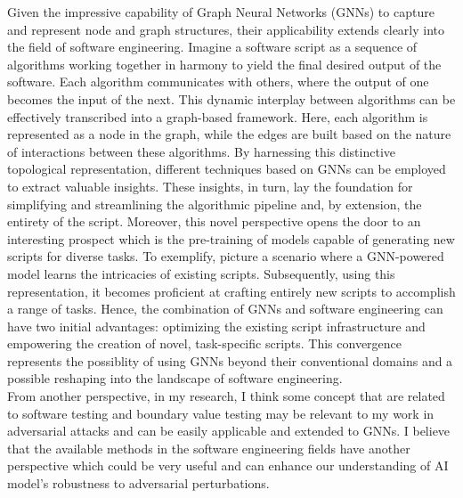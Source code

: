 \documentclass[a4paper,11pt]{article}
\begin{document}
\noindent Given the impressive capability of Graph Neural Networks (GNNs) to capture and represent node and graph structures, their applicability extends clearly into the field of software engineering. Imagine a software script as a sequence of algorithms working together in harmony to yield the final desired output of the software. Each algorithm communicates with others, where the output of one becomes the input of the next. This dynamic interplay between algorithms can be effectively transcribed into a graph-based framework. Here, each algorithm is represented as a node in the graph, while the edges are built based on the nature of interactions between these algorithms. By harnessing this distinctive topological representation, different techniques based on GNNs can be employed to extract valuable insights. These insights, in turn, lay the foundation for simplifying and streamlining the algorithmic pipeline and, by extension, the entirety of the script. Moreover, this novel perspective opens the door to an interesting prospect which is the pre-training of models capable of generating new scripts for diverse tasks. To exemplify, picture a scenario where a GNN-powered model learns the intricacies of existing scripts. Subsequently, using this representation, it becomes proficient at crafting entirely new scripts to accomplish a range of tasks. Hence, the combination of GNNs and software engineering can have two initial advantages: optimizing the existing script infrastructure and empowering the creation of novel, task-specific scripts. This convergence represents the possiblity of using GNNs beyond their conventional domains and a possible reshaping into the landscape of software engineering. \\


\noindent From another perspective, in my research, I think some concept that are related to software testing and boundary value testing may be relevant to my work in adversarial attacks and can be easily applicable and extended to GNNs. I believe that the available methods in the software engineering fields have another perspective which could be very useful and can enhance our understanding of AI model's robustness to adversarial perturbations. 




\end{document}

